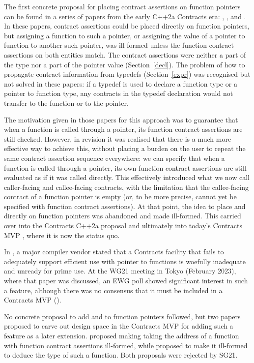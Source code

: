 The first concrete proposal for placing contract assertions on function pointers can be found in a series of papers from the early C++2a Contracts era: \cite{N4415}, \cite{P0287R0}, and \cite{P0380R0}. In these papers, contract assertions could be placed directly on function pointers, but assigning a function to such a pointer, or assigning the value of a pointer to function to another such pointer, was ill-formed unless the function contract assertions on both entities match. The contract assertions were neither a part of the type nor a part of the pointer value (Section~\ref{decl}). The problem of how to propagate contract information from typedefs (Section~\ref{expr}) was recognised but not solved in these papers:  if a typedef is used to declare a function type or a pointer to function type, any contracts in the typedef declaration would not transfer to the function or to the pointer.

The motivation given in those papers for this approach was to guarantee that when a function is called through a pointer, its function contract assertions are still checked. However, in revision \cite{P0380R1} it was realised that there is a much more effective way to achieve this, without placing a burden on the user to repeat the same contract assertion sequence everywhere: we can specify that when a function is called through a pointer, its own function contract assertions are still evaluated as if it was called directly. This effectively introduced what we now call caller-facing and callee-facing contracts, with the limitation that the callee-facing contract of a function pointer is empty (or, to be more precise, cannot yet be specified with function contract assertions). At that point, the idea to place  and  directly on function pointers was abandoned and made ill-formed. This carried over into the Contracts C++2a proposal \cite{P0542R5} and ultimately into today's Contracts MVP \cite{P2900R9}, where it is now the status quo.

In \cite{P3173R0}, a major compiler vendor stated that a Contracts facility that fails to adequately support efficient use with pointer to functions is woefully inadequate and unready for prime use. At the WG21 meeting in Tokyo (February 2023), where that paper was discussed, an EWG poll showed significant interest in such a feature, although there was no consensus that it must be included in a Contracts MVP (\cite{P3197R0}).

No concrete proposal to add  and  to function pointers followed, but two papers proposed to carve out design space in the Contracts MVP for adding such a feature as a later extension. \cite{P3221R0} proposed making taking the address of a function with function contract assertions ill-formed, while \cite{P3250R0} proposed to make it ill-formed to deduce the type of such a function. Both proposals were rejected by SG21.

